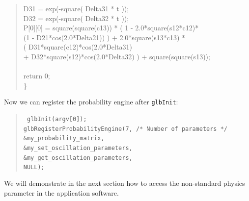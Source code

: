 \begin{quote}
{  \hspace*{0.5cm} D31 = exp(-square( Delta31 * t )); \\
  \hspace*{0.5cm} D32 = exp(-square( Delta32 * t )); \\
  \hspace*{0.5cm} P[0][0] = square(square(c13)) * ( 1 - 2.0*square(s12*c12)* \\
  \hspace*{1cm} (1 - D21*cos(2.0*Delta21)) ) 
  \hspace*{1cm} + 2.0*square(s13*c13) * \\
  \hspace*{1cm} ( D31*square(c12)*cos(2.0*Delta31) \\
  \hspace*{1cm} + D32*square(s12)*cos(2.0*Delta32) )  + square(square(s13)); \\
\\
  \hspace*{0.5cm} return 0; \\
\}
}
\end{quote}
Now we can register the probability engine after {\tt glbInit}:
\begin{quote}
{\tt
  glbInit(argv[0]); \\
  glbRegisterProbabilityEngine(7,      /* Number of parameters */ \\
  \hspace*{1cm}                             \&my\_probability\_matrix, \\
  \hspace*{1cm}                             \&my\_set\_oscillation\_parameters, \\
  \hspace*{1cm}                             \&my\_get\_oscillation\_parameters, \\
  \hspace*{1cm}                             NULL); 
}
\end{quote}
We will demonstrate in the next section how to access the non-standard physics 
parameter in the application software.

